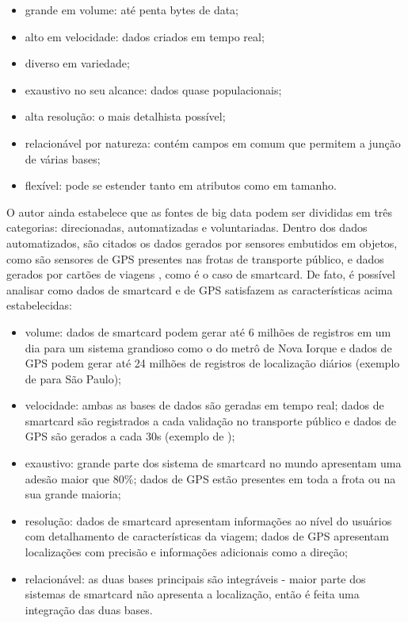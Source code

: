 \documentclass[        
    a4paper,          %
    12pt,             %
    chapter=TITLE,    %
    section=Title,    %
    subsection=Title, %
    oneside,          %
    english,          %
    spanish,          %
    brazil,           %
    fleqn             %
]{abntex2}
\begin{document}
  \begin{itemize}
  \tightlist
  \item
    grande em volume: até penta bytes de data;
  \item
    alto em velocidade: dados criados em tempo real;
  \item
    diverso em variedade;
  \item
    exaustivo no seu alcance: dados quase populacionais;
  \item
    alta resolução: o mais detalhista possível;
  \item
    relacionável por natureza: contém campos em comum que permitem a junção de várias bases;
  \item
    flexível: pode se estender tanto em atributos como em tamanho.
  \end{itemize}
  
  O autor ainda estabelece que as fontes de big data podem ser divididas em três categorias: direcionadas, automatizadas e voluntariadas. Dentro dos dados automatizados, são citados os dados gerados por sensores embutidos em objetos, como são sensores de GPS presentes nas frotas de transporte público, e dados gerados por cartões de viagens \citep{Kitchin2013}, como é o caso de smartcard. De fato, é possível analisar como dados de smartcard e de GPS satisfazem as características acima estabelecidas:
  
  \begin{itemize}
  \tightlist
  \item
    volume: dados de smartcard podem gerar até 6 milhões de registros em um dia para um sistema grandioso como o do metrô de Nova Iorque \citep{Barry2002} e dados de GPS podem gerar até 24 milhões de registros de localização diários (exemplo de \citet{Arbex2016} para São Paulo);
  \item
    velocidade: ambas as bases de dados são geradas em tempo real; dados de smartcard são registrados a cada validação no transporte público e dados de GPS são gerados a cada 30s (exemplo de \citet{Cortes2011});
  \item
    exaustivo: grande parte dos sistema de smartcard no mundo apresentam uma adesão maior que 80\%; dados de GPS estão presentes em toda a frota ou na sua grande maioria;
  \item
    resolução: dados de smartcard apresentam informações ao nível do usuários com detalhamento de características da viagem; dados de GPS apresentam localizações com precisão e informações adicionais como a direção;
  \item
    relacionável: as duas bases principais são integráveis - maior parte dos sistemas de smartcard não apresenta a localização, então é feita uma integração das duas bases.
  \end{itemize}
  
\end{document}
